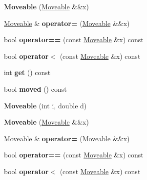 \begin{DoxyCompactItemize}
{\bfseries Moveable} (\mbox{\hyperlink{class_moveable}{Moveable}} \&\&x)
\item 
\mbox{\label{class_moveable_ab53585b17a1e20ec6c1a25a530634a92}} 
\mbox{\hyperlink{class_moveable}{Moveable}} \& {\bfseries operator=} (\mbox{\hyperlink{class_moveable}{Moveable}} \&\&x)
\item 
\mbox{\label{class_moveable_a913e4886aa94c7d876fab5be7dd44988}} 
bool {\bfseries operator==} (const \mbox{\hyperlink{class_moveable}{Moveable}} \&x) const
\item 
\mbox{\label{class_moveable_a7f5c349c4cef251010951bf012e67267}} 
bool {\bfseries operator$<$} (const \mbox{\hyperlink{class_moveable}{Moveable}} \&x) const
\item 
\mbox{\label{class_moveable_a99435c0b3477247e039d148d4ade71ec}} 
int {\bfseries get} () const
\item 
\mbox{\label{class_moveable_a304d31368cde7d7d111477eef8453487}} 
bool {\bfseries moved} () const
\item 
\mbox{\label{class_moveable_abb9e849473ef67d2e62a5c310d60dee9}} 
{\bfseries Moveable} (int i, double d)
\item 
\mbox{\label{class_moveable_a8efd14a2649c1396e6461fbae17c36b1}} 
{\bfseries Moveable} (\mbox{\hyperlink{class_moveable}{Moveable}} \&\&x)
\item 
\mbox{\label{class_moveable_ab53585b17a1e20ec6c1a25a530634a92}} 
\mbox{\hyperlink{class_moveable}{Moveable}} \& {\bfseries operator=} (\mbox{\hyperlink{class_moveable}{Moveable}} \&\&x)
\item 
\mbox{\label{class_moveable_a913e4886aa94c7d876fab5be7dd44988}} 
bool {\bfseries operator==} (const \mbox{\hyperlink{class_moveable}{Moveable}} \&x) const
\item 
\mbox{\label{class_moveable_a7f5c349c4cef251010951bf012e67267}} 
bool {\bfseries operator$<$} (const \mbox{\hyperlink{class_moveable}{Moveable}} \&x) const
\item 

\end{DoxyCompactItemize}
